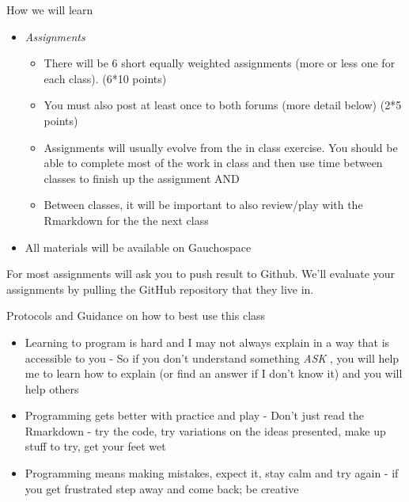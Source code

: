 \documentclass[
  ignorenonframetext,
]{beamer}
\providecommand{\tightlist}{%
  \setlength{\itemsep}{0pt}\setlength{\parskip}{0pt}}
\begin{document}
\begin{frame}{How we will learn}
\protect\hypertarget{how-we-will-learn-1}{}

\begin{itemize}
\item
  \emph{Assignments}

  \begin{itemize}
  \tightlist
  \item
    There will be 6 short equally weighted assignments (more or less one
    for each class). (6*10 points)
  \item
    You must also post at least once to both forums (more detail below)
    (2*5 points)
  \item
    Assignments will usually evolve from the in class exercise. You
    should be able to complete most of the work in class and then use
    time between classes to finish up the assignment AND
  \item
    Between classes, it will be important to also review/play with the
    Rmarkdown for the the next class
  \end{itemize}
\item
  All materials will be available on Gauchospace
\end{itemize}

For most assignments will ask you to push result to Github. We'll
evaluate your assignments by pulling the GitHub repository that they
live in.

\end{frame}

\begin{frame}{Protocols and Guidance on how to best use this class}
\protect\hypertarget{protocols-and-guidance-on-how-to-best-use-this-class}{}

\begin{itemize}
\item
  Learning to program is hard and I may not always explain in a way that
  is accessible to you - So if you don't understand something \emph{ASK}
  , you will help me to learn how to explain (or find an answer if I
  don't know it) and you will help others
\item
  Programming gets better with practice and play - Don't just read the
  Rmarkdown - try the code, try variations on the ideas presented, make
  up stuff to try, get your feet wet
\item
  Programming means making mistakes, expect it, stay calm and try again
  - if you get frustrated step away and come back; be creative
\end{itemize}

\end{frame}
\end{document}
